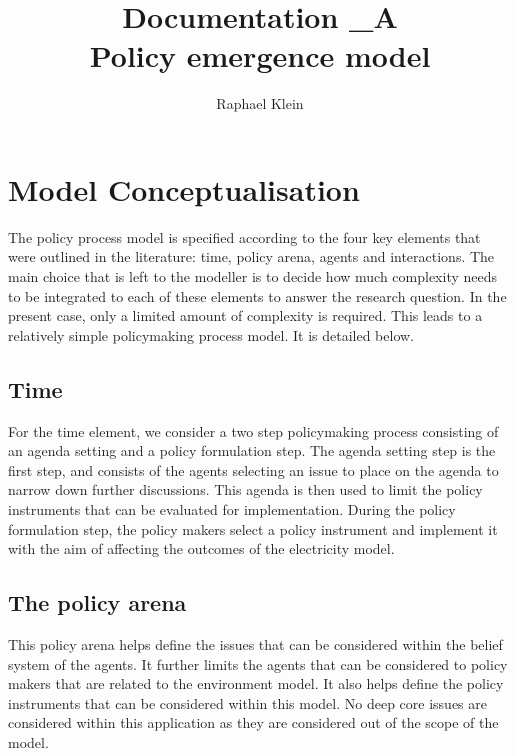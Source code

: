 \documentclass[11pt]{article}
\title{Documentation \_A \\ Policy emergence model}
\author{Raphael Klein}
\begin{document}
\maketitle



\tableofcontents

\section{Model Conceptualisation}

The policy process model is specified according to the four key elements that were outlined in the literature: time, policy arena, agents and interactions. The main choice that is left to the modeller is to decide how much complexity needs to be integrated to each of these elements to answer the research question. In the present case, only a limited amount of complexity is required. This leads to a relatively simple policymaking process model. It is detailed below.

\subsection{Time}

For the time element, we consider a two step policymaking process consisting of an agenda setting and a policy formulation step. The agenda setting step is the first step, and consists of the agents selecting an issue to place on the agenda to narrow down further discussions. This agenda is then used to limit the policy instruments that can be evaluated for implementation. During the policy formulation step, the policy makers select a policy instrument and implement it with the aim of affecting the outcomes of the electricity model.


\subsection{The policy arena}

This policy arena helps define the issues that can be considered within the belief system of the agents. It further limits the agents that can be considered to policy makers that are related to the environment model. It also helps define the policy instruments that can be considered within this model. No deep core issues are considered within this application as they are considered out of the scope of the model.
\end{document}
